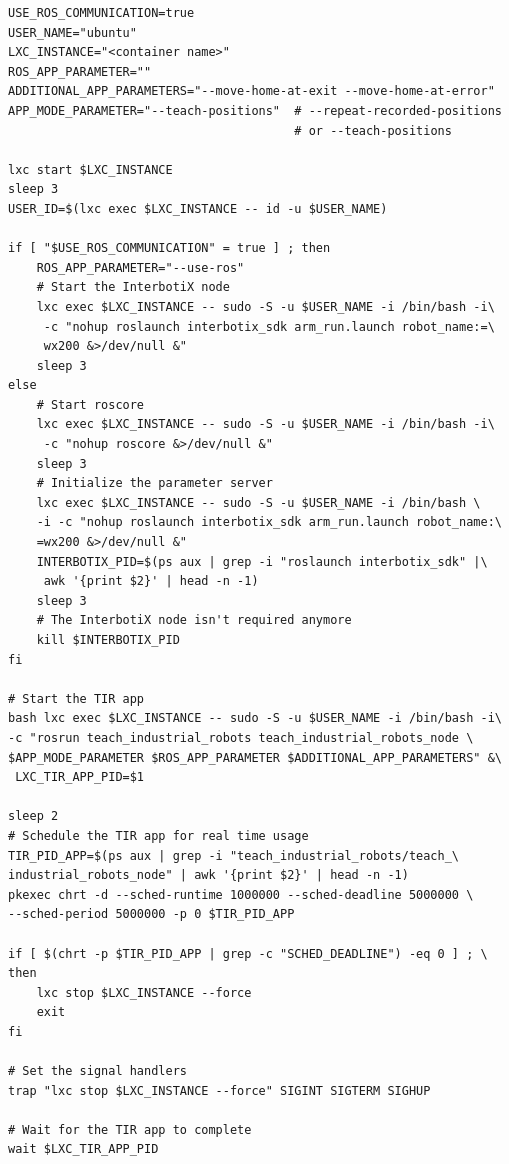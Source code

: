 \begin{lstlisting}[style=bash, caption={Script zum Starten der Roboter-Gesten-Anwendung}, label={lst:start_script_for_app}]
USE_ROS_COMMUNICATION=true
USER_NAME="ubuntu"
LXC_INSTANCE="<container name>"
ROS_APP_PARAMETER=""
ADDITIONAL_APP_PARAMETERS="--move-home-at-exit --move-home-at-error"
APP_MODE_PARAMETER="--teach-positions"  # --repeat-recorded-positions
                                        # or --teach-positions

lxc start $LXC_INSTANCE
sleep 3
USER_ID=$(lxc exec $LXC_INSTANCE -- id -u $USER_NAME)

if [ "$USE_ROS_COMMUNICATION" = true ] ; then
    ROS_APP_PARAMETER="--use-ros"
    # Start the InterbotiX node
    lxc exec $LXC_INSTANCE -- sudo -S -u $USER_NAME -i /bin/bash -i\
     -c "nohup roslaunch interbotix_sdk arm_run.launch robot_name:=\
     wx200 &>/dev/null &"
    sleep 3
else
    # Start roscore
    lxc exec $LXC_INSTANCE -- sudo -S -u $USER_NAME -i /bin/bash -i\
     -c "nohup roscore &>/dev/null &"
    sleep 3
    # Initialize the parameter server
    lxc exec $LXC_INSTANCE -- sudo -S -u $USER_NAME -i /bin/bash \
    -i -c "nohup roslaunch interbotix_sdk arm_run.launch robot_name:\
    =wx200 &>/dev/null &"
    INTERBOTIX_PID=$(ps aux | grep -i "roslaunch interbotix_sdk" |\
     awk '{print $2}' | head -n -1)
    sleep 3
    # The InterbotiX node isn't required anymore
    kill $INTERBOTIX_PID
fi

# Start the TIR app
bash lxc exec $LXC_INSTANCE -- sudo -S -u $USER_NAME -i /bin/bash -i\
-c "rosrun teach_industrial_robots teach_industrial_robots_node \
$APP_MODE_PARAMETER $ROS_APP_PARAMETER $ADDITIONAL_APP_PARAMETERS" &\
 LXC_TIR_APP_PID=$1

sleep 2
# Schedule the TIR app for real time usage
TIR_PID_APP=$(ps aux | grep -i "teach_industrial_robots/teach_\
industrial_robots_node" | awk '{print $2}' | head -n -1)
pkexec chrt -d --sched-runtime 1000000 --sched-deadline 5000000 \
--sched-period 5000000 -p 0 $TIR_PID_APP

if [ $(chrt -p $TIR_PID_APP | grep -c "SCHED_DEADLINE") -eq 0 ] ; \
then
    lxc stop $LXC_INSTANCE --force
    exit
fi

# Set the signal handlers
trap "lxc stop $LXC_INSTANCE --force" SIGINT SIGTERM SIGHUP

# Wait for the TIR app to complete
wait $LXC_TIR_APP_PID
\end{lstlisting}



